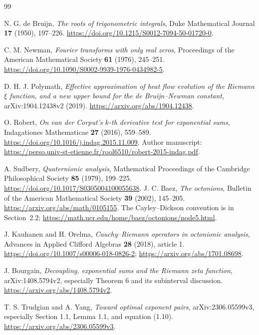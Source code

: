\documentclass[11pt]{article}
\numberwithin{equation}{section}
\theoremstyle{definition}
\theoremstyle{remark}
\begin{document}
\begin{thebibliography}{99}
\raggedright
{}
N. G. de Bruijn,
\emph{The roots of trigonometric integrals},
Duke Mathematical Journal \textbf{17} (1950), 197--226.
\url{https://doi.org/10.1215/S0012-7094-50-01720-0}.

C. M. Newman,
\emph{Fourier transforms with only real zeros},
Proceedings of the American Mathematical Society \textbf{61} (1976),
245--251.
\url{https://doi.org/10.1090/S0002-9939-1976-0434982-5}.

D. H. J. Polymath,
\emph{Effective approximation of heat flow evolution of the Riemann
$\xi$ function, and a new upper bound for the de Bruijn--Newman constant},
arXiv:1904.12438v2 (2019).
\url{https://arxiv.org/abs/1904.12438}.

O. Robert,
\emph{On van der Corput's $k$-th derivative test for exponential sums},
Indagationes Mathematicae \textbf{27} (2016), 559--589.
\url{https://doi.org/10.1016/j.indag.2015.11.009}.
Author manuscript:
\url{https://perso.univ-st-etienne.fr/rool6510/robert-2015-indag.pdf}.

A. Sudbery,
\emph{Quaternionic analysis},
Mathematical Proceedings of the Cambridge Philosophical Society
\textbf{85} (1979), 199--225.
\url{https://doi.org/10.1017/S0305004100055638}.
J. C. Baez,
\emph{The octonions},
Bulletin of the American Mathematical Society \textbf{39} (2002), 145--205.
\url{https://arxiv.org/abs/math/0105155}.
The Cayley--Dickson convention is in Section~2.2;
\url{https://math.ucr.edu/home/baez/octonions/node5.html}.

J. Kauhanen and H. Orelma,
\emph{Cauchy--Riemann operators in octonionic analysis},
Advances in Applied Clifford Algebras \textbf{28} (2018), article 1.
\url{https://doi.org/10.1007/s00006-018-0826-2};
\url{https://arxiv.org/abs/1701.08698}.

J. Bourgain,
\emph{Decoupling, exponential sums and the Riemann zeta function},
arXiv:1408.5794v2, especially Theorem 6 and its subinterval discussion.
\url{https://arxiv.org/abs/1408.5794v2}.

T. S. Trudgian and A. Yang,
\emph{Toward optimal exponent pairs},
arXiv:2306.05599v3, especially Section 1.1, Lemma 1.1, and equation (1.10).
\url{https://arxiv.org/abs/2306.05599v3}.


\end{thebibliography}
\end{document}
